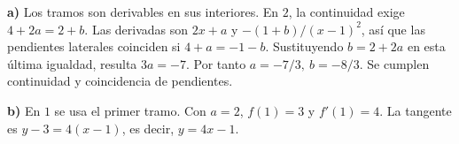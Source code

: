 \textbf{a)} Los tramos son derivables en sus interiores.
En $2$, la continuidad exige $4+2a=2+b$.
Las derivadas son $2x+a$ y $-(1+b)/(x-1)^2$,
así que las pendientes laterales coinciden si $4+a=-1-b$.
Sustituyendo $b=2+2a$ en esta última igualdad,
resulta $3a=-7$. Por tanto $\boxed{a=-7/3,\ b=-8/3}$.
Se cumplen continuidad y coincidencia de pendientes.

\textbf{b)} En $1$ se usa el primer tramo. Con $a=2$,
$f(1)=3$ y $f'(1)=4$. La tangente es $y-3=4(x-1)$,
es decir, $\boxed{y=4x-1}$.
